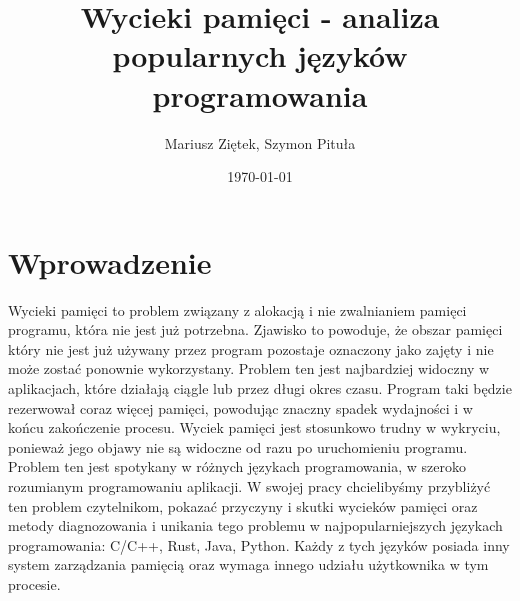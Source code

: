 \documentclass[12pt]{article}
\title{Wycieki pamięci - analiza popularnych języków programowania}
\author{Mariusz Ziętek, Szymon Pituła}
\date{\today}
\begin{document}
\maketitle
\newpage
\tableofcontents
\newpage
\section{Wprowadzenie}
Wycieki pamięci to problem związany z alokacją i nie zwalnianiem pamięci programu, która nie jest już potrzebna.  Zjawisko to powoduje, że obszar pamięci który nie jest już używany przez program pozostaje oznaczony jako zajęty i nie może zostać ponownie wykorzystany. Problem ten jest najbardziej widoczny w aplikacjach, które działają ciągle lub przez długi okres czasu. Program taki będzie rezerwował coraz więcej pamięci, powodując znaczny spadek wydajności i w końcu zakończenie procesu. Wyciek pamięci jest stosunkowo trudny w wykryciu, ponieważ jego objawy nie są widoczne od razu po uruchomieniu programu. Problem ten jest spotykany w różnych językach programowania, w szeroko rozumianym programowaniu aplikacji. W swojej pracy chcielibyśmy przybliżyć ten problem czytelnikom, pokazać przyczyny i skutki wycieków pamięci oraz metody diagnozowania i unikania tego problemu w najpopularniejszych językach programowania: C/C++, Rust, Java, Python. Każdy z tych języków posiada inny system zarządzania pamięcią oraz wymaga innego udziału użytkownika w tym procesie.
\end{document}
